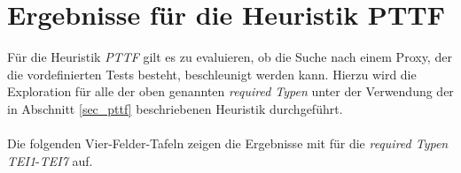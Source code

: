 \section{Ergebnisse für die Heuristik PTTF}\label{sec_evalPTTF}
Für die Heuristik \emph{PTTF} gilt es zu evaluieren, ob die Suche nach einem Proxy, der die vordefinierten Tests besteht, beschleunigt werden kann. Hierzu wird die Exploration für alle der oben genannten \emph{required Typen} unter der Verwendung der in Abschnitt \ref{sec_pttf} beschriebenen Heuristik durchgeführt.
\\\\
Die folgenden Vier-Felder-Tafeln zeigen die Ergebnisse mit für die \emph{required Typen} \emph{TEI1}-\emph{TEI7} auf.
\begin{multicols}{3}
\end{multicols}
\pagebreak
\begin{multicols}{2}
\end{multicols}

\begin{multicols}{2}
\end{multicols}

